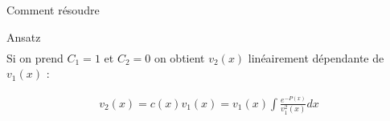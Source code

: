 \begin{parag}{Comment résoudre}
\begin{subparag}{Ansatz}
\begin{align*}
           \end{align*}
           Si on prend $C_1 = 1$ et $C_2 = 0$ on obtient $v_2(x)$ linéairement dépendante de $v_1(x)$ : 
           \begin{theoreme}
               \begin{align*}
                   v_2(x) = c(x)v_1(x) = v_1(x) \int \frac{e^{-P(x)}}{v_1^2(x)} dx
               \end{align*}
               
           \end{theoreme}
           
           
           
           
           
        \end{subparag}
    
    \end{parag}
    

